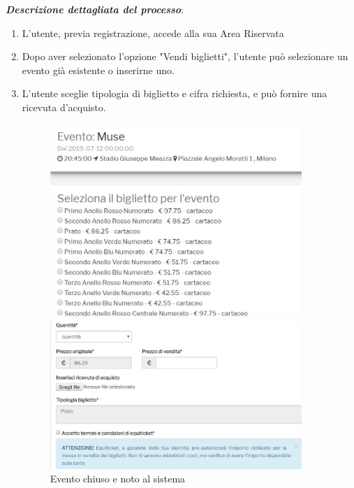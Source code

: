 \textbf{\textit{Descrizione dettagliata del processo}}:
\begin{enumerate}
\item L'utente, previa registrazione, accede alla sua Area Riservata
\item Dopo aver selezionato l'opzione "Vendi biglietti", l'utente può selezionare un evento già esistente o inserirne uno.
\item L'utente sceglie tipologia di biglietto e cifra richiesta, e può fornire una ricevuta d'acquisto.
\begin{figure}[H]
    \centering
    \begin{minipage}{0.45\textwidth}
        \centering
        \includegraphics[width=0.9\textwidth]{chapter4/immagini/es_chiuso} %
        \caption{Evento chiuso e noto al sistema}
				\label{evchiuso1}
    \end{minipage}\hfill
    \begin{minipage}{0.45\textwidth}
        \centering
        \includegraphics[width=0.9\textwidth]{chapter4/immagini/es_chiuso_2} %

\end{minipage}
\end{figure}
\end{enumerate}
